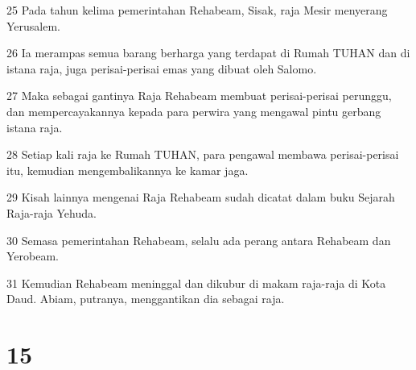 \par 25 Pada tahun kelima pemerintahan Rehabeam, Sisak, raja Mesir menyerang Yerusalem.
\par 26 Ia merampas semua barang berharga yang terdapat di Rumah TUHAN dan di istana raja, juga perisai-perisai emas yang dibuat oleh Salomo.
\par 27 Maka sebagai gantinya Raja Rehabeam membuat perisai-perisai perunggu, dan mempercayakannya kepada para perwira yang mengawal pintu gerbang istana raja.
\par 28 Setiap kali raja ke Rumah TUHAN, para pengawal membawa perisai-perisai itu, kemudian mengembalikannya ke kamar jaga.
\par 29 Kisah lainnya mengenai Raja Rehabeam sudah dicatat dalam buku Sejarah Raja-raja Yehuda.
\par 30 Semasa pemerintahan Rehabeam, selalu ada perang antara Rehabeam dan Yerobeam.
\par 31 Kemudian Rehabeam meninggal dan dikubur di makam raja-raja di Kota Daud. Abiam, putranya, menggantikan dia sebagai raja.

\chapter{15}

